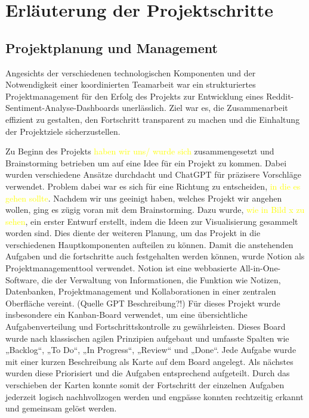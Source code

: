 \section{Erläuterung der Projektschritte}
\subsection{Projektplanung und Management}

Angesichts der verschiedenen technologischen Komponenten und der Notwendigkeit einer koordinierten Teamarbeit war ein strukturiertes Projektmanagement für den Erfolg des Projekts zur Entwicklung eines Reddit-Sentiment-Analyse-Dashboards unerlässlich. Ziel war es, die Zusammenarbeit effizient zu gestalten, den Fortschritt transparent zu machen und die Einhaltung der Projektziele sicherzustellen. 

Zu Beginn des Projekts \textcolor{yellow}{haben wir uns/ wurde sich} zusammengesetzt und Brainstorming betrieben um auf eine Idee für ein Projekt zu kommen. Dabei wurden verschiedene Ansätze durchdacht und ChatGPT für präzisere Vorschläge verwendet. Problem dabei war es sich für eine Richtung zu entscheiden, \textcolor{yellow}{in die es gehen sollte}. Nachdem wir uns geeinigt haben, welches Projekt wir angehen wollen, ging es zügig voran mit dem Brainstorming. Dazu wurde, \textcolor{yellow}{wie in Bild x zu sehen}, ein erster Entwurf erstellt, indem die Ideen zur Visualisierung gesammelt worden sind. Dies diente der weiteren Planung, um das Projekt in die verschiedenen Hauptkomponenten aufteilen zu können. Damit die anstehenden Aufgaben und die fortschritte auch festgehalten werden können, wurde Notion als Projektmanagementtool verwendet. Notion ist eine webbasierte All-in-One-Software, die der Verwaltung von Informationen, die Funktion wie Notizen, Datenbanken, Projektmanagement und Kollaborationen in einer zentralen Oberfläche vereint. (Quelle GPT Beschreibung?!) Für dieses Projekt wurde insbesondere ein Kanban-Board verwendet, um eine übersichtliche Aufgabenverteilung und Fortschrittskontrolle zu gewährleisten. Dieses Board wurde nach klassischen agilen Prinzipien aufgebaut und umfasste Spalten wie „Backlog“, „To Do“, „In Progress“, „Review“ und „Done“. Jede Aufgabe wurde mit einer kurzen Beschreibung als Karte auf dem Board angelegt. Als nächstes wurden diese Priorisiert und die Aufgaben entsprechend aufgeteilt. Durch das verschieben der Karten konnte somit der Fortschritt der einzelnen Aufgaben jederzeit logisch nachhvollzogen werden und engpässe konnten rechtzeitig erkannt  und gemeinsam gelöst werden.

